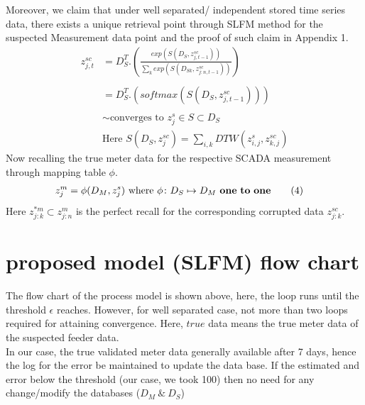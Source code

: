 \documentclass[conference]{IEEEtran}
\begin{document}
Moreover, we claim that under well separated/ independent stored time series data, there exists a unique retrieval point through SLFM method for the suspected Measurement data point and the proof of such claim in Appendix 1.
\begin{align*}
 z^{sc}_{j,t }& =D_{S}^T.{( \frac{exp(S(D_{S},{z^{sc}_{j,t-1}}))}{\sum_k exp(S(D_{Sk} ,{z^{sc}_{j:n,t-1}}))} )}\\ \\
& =D_{S}^T.{(softmax(S(D_S,{z^{sc}_{j,{t-1}}})))} \tag{3} \\ \\
& \sim \text{converges to  $z^{s}_{j}\in S \subset D_S$ } \\
& \text{Here } S(D_{S},{z^{sc}_{j}})  = \sum_{i,k}{DTW({z^s_{i,j},z^{sc}_{k,j}})}
\end{align*}
Now recalling the true meter data for the respective SCADA measurement through mapping table $\phi$.
\begin{align}
z^{{m}}_{j} &= \phi(D_{M},z^{s}_{j}) \ \text {where  $\phi \colon D_S\mapsto D_M$ $\bf{one\ to\ one}$} \tag{4} 
\end{align}
Here $z^{{*m}}_{j:k} \subset z^{{m}}_{j:n}$ is the perfect recall for the corresponding corrupted data $z^{sc}_{j:k}$.\\

\section{proposed model (SLFM) flow chart}

The flow chart of the process model is shown above, here, the loop runs until the threshold $\epsilon$ reaches. However, for well separated case, not more than two loops required for attaining convergence. Here, $true$ data means the true meter data of the suspected feeder data.\\

 In our case, the true validated meter data generally available after 7 days, hence the log for the error be maintained to update the data base. If the estimated and error below the threshold (our case, we took 100) then no need for any change/modify the databases ($D_M \ \& \ D_S$)
\end{document}

